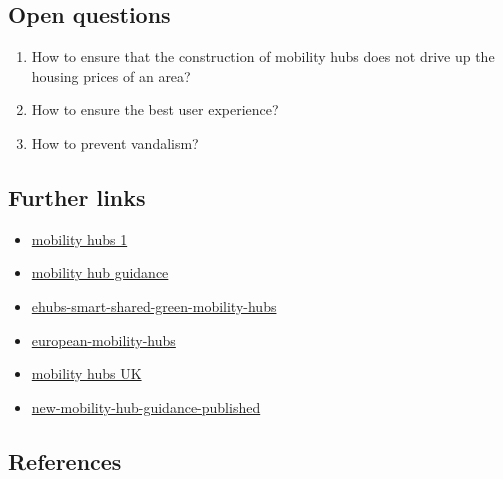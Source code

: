 \documentclass[
]{book}
\providecommand{\tightlist}{%
  \setlength{\itemsep}{0pt}\setlength{\parskip}{0pt}}
\begin{document}
\hypertarget{open-questions-20}{%
\subsection*{Open questions}\label{open-questions-20}}

\begin{enumerate}
\def\labelenumi{\arabic{enumi}.}
\tightlist
\item
  How to ensure that the construction of mobility hubs does not drive up the housing prices of an area?
\item
  How to ensure the best user experience?
\item
  How to prevent vandalism?
\end{enumerate}

\hypertarget{further-links-18}{%
\subsection*{Further links}\label{further-links-18}}

\begin{itemize}
\tightlist
\item
  \href{https://mobility-as-a-service.blog/mobility-hubs/}{mobility hubs 1}
\item
  \href{https://como.org.uk/wp-content/uploads/2019/10/Mobility-Hub-Guide-241019-final.pdf}{mobility hub guidance}
\item
  \href{https://www.nweurope.eu/projects/project-search/ehubs-smart-shared-green-mobility-hubs/}{ehubs-smart-shared-green-mobility-hubs}
\item
  \href{https://www.metro-magazine.com/10122757/a-look-at-european-mobility-hubs}{european-mobility-hubs}
\item
  \href{https://www.intelligenttransport.com/transport-articles/98414/what-the-uk-can-learn-from-europe-on-mobility-hubs-and-shared-transport/}{mobility hubs UK}
\item
  \href{https://www.eltis.org/in-brief/news/new-mobility-hub-guidance-published}{new-mobility-hub-guidance-published}
\end{itemize}

\hypertarget{references-20}{%
\subsection*{References}\label{references-20}}
\end{document}
